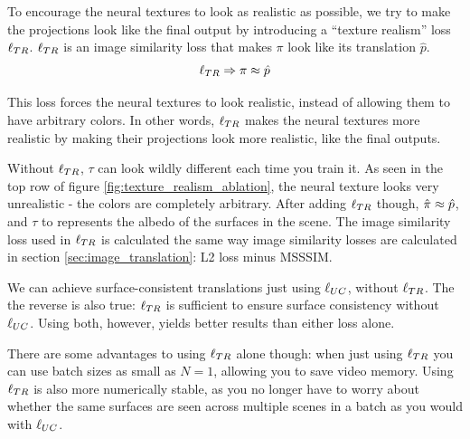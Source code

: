 \documentclass{article}
\begin{document}
	To encourage the neural textures to look as realistic as possible, we try to make the projections look like the final output by introducing a ``texture realism'' loss $\ell_{TR}$. 
	$\ell_{TR}$ is an image similarity loss that makes $\pi$ look like its translation $\hat{p}$.
	\begin{equation}
		\ell_{TR} \Rightarrow \pi \approx \hat{p}
	\end{equation}

	This loss forces the neural textures to look realistic, instead of allowing them to have arbitrary colors.
	In other words, $\ell_{TR}$ makes the neural textures more realistic by making their projections look more realistic, like the final outputs.


	Without $\ell_{TR}$, $\tau$ can look wildly different each time you train it.
	As seen in the top row of figure \ref{fig:texture_realism_ablation}, the neural texture looks very unrealistic - the colors are completely arbitrary.
	After adding $\ell_{TR}$ though, $\hat{\pi} \approx \hat{p}$, and $\tau$ to represents the albedo of the surfaces in the scene.
	The image similarity loss used in $\ell_{TR}$ is calculated the same way image similarity losses are calculated in section \ref{sec:image_translation}: L2 loss minus MSSSIM.
	
	We can achieve surface-consistent translations just using $\ell_{UC}$, without $\ell_{TR}$.
	The the reverse is also true: $\ell_{TR}$ is sufficient to ensure surface consistency without $\ell_{UC}$.
	Using both, however, yields better results than either loss alone. 
	
	There are some advantages to using $\ell_{TR}$ alone though: when just using $\ell_{TR}$ you can use batch sizes as small as $N=1$, allowing you to save video memory. 
	Using $\ell_{TR}$ is also more numerically stable, as you no longer have to worry about whether the same surfaces are seen across multiple scenes in a batch as you would with $\ell_{UC}$.
\end{document}
